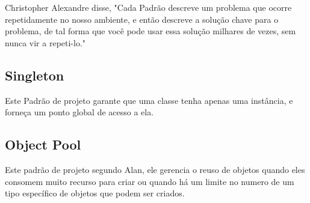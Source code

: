 Christopher Alexandre disse, "Cada Padrão descreve um problema que ocorre repetidamente no nosso ambiente, e então descreve a solução chave para o problema, de tal forma que você pode usar essa solução milhares de vezes, sem nunca vir a repeti-lo." \cite{cris} 

\subsection{Singleton}	
Este Padrão de projeto garante que uma classe tenha apenas uma instância, e forneça um ponto global de acesso a ela.  \cite{gra} 

\subsection{Object Pool}	
Este padrão de projeto segundo Alan, ele gerencia o reuso de objetos quando eles consomem muito recurso para criar ou quando há um limite no numero de um tipo específico de objetos que podem ser criados. \cite{alan}